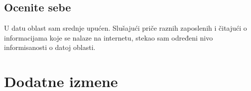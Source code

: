 \documentclass[a4paper]{report}
\begin{document}
\section{Ocenite sebe}
U datu oblast sam srednje upućen. Slušajući priče raznih zaposlenih i čitajući o informacijama koje se nalaze na internetu, stekao sam određeni nivo informisanosti o datoj oblasti.


\chapter{Dodatne izmene}
\end{document}
